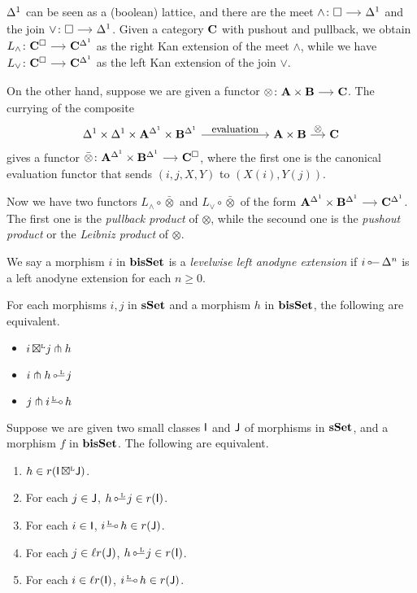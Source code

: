 \documentclass[a4paper,  dvipsnames, 11pt]{amsart}
\begin{document}
\begin{observation}
	${\Delta^1}$ can be seen as a (boolean) lattice, and there are
	the meet $\land\colon\Box\arr\ra$ and the join $\lor\colon\Box\arr\ra$.
	Given a category $\mathbf{C}$ with pushout and pullback,
	we obtain $L_\land\colon\one{C}^\Box\arr\one{C}^\ra$ as the right Kan extension of the meet $\land$,
	while we have $L_\lor\colon\one{C}^\Box\arr\one{C}^\ra$ as the left Kan extension of the join $\lor$.

	On the other hand, suppose we are given a functor $\otimes\colon\one{A}\times\one{B}\arr\one{C}$.
	The currying of the composite
	\[
		\ra\times\ra\times\one{A}^\ra\times\one{B}^\ra
		\arr"\text{evaluation}"[][6]
		\one{A}\times\one{B}
		\arr"\otimes"
		\one{C}
	\]
	gives a functor $\bar\otimes\colon\one{A}^\ra\times\one{B}^\ra\arr\one{C}^\Box$,
	where the first one is the canonical evaluation functor that sends $(i,j,X,Y)$ to $(X(i),Y(j))$.

	Now we have two functors $L_\land\circ\bar\otimes$ and $L_\lor\circ\bar\otimes$ of the form $\one{A}^\ra\times\one{B}^\ra\arr\one{C}^\ra$.
	The first one is the \textit{pullback product} of $\otimes$, while the secound one is the \textit{pushout product} or the \textit{Leibniz product} of $\otimes$.
\end{observation}
\begin{definition}
	We say a morphism $i$ in $\mathbf{bisSet}$
	is a \emph{levelwise left anodyne extension} if
	$i\lollipop \Delta^n$ is a left anodyne extension for each $n\geq 0$.
\end{definition}
\begin{lemma}
	\label{lem:pitchfork}
	For each morphisms $i,j$ in $\mathbf{sSet}$ and a morphism $h$ in $\mathbf{bisSet}$, the following are equivalent.
	\begin{itemize}
		\item %
			$i{\mathrel{\,\boxtimes^{\text{\tiny{L}}}}} j\pitchfork h$
		\item %
			$i\pitchfork h\lollipopL j$
		\item %
			$j\pitchfork i\rollipopL h$
	\end{itemize}
\end{lemma}
\begin{lemma}
	Suppose we are given two small classes $\mathsf{I}$ and $\mathsf{J}$ of morphisms in $\mathbf{sSet}$, and a morphism $f$ in $\mathbf{bisSet}$.
	The following are equivalent.
	\begin{enumerate}
		\item %
			$h\in r(\mathsf{I}{\mathrel{\,\boxtimes^{\text{\tiny{L}}}}}\mathsf{J})$.
		\item %
			For each $j\in\mathsf{J}$, $h\lollipopL j\in r(\I)$.
		\item %
			For each $i\in\mathsf{I}$, $i\rollipopL h\in r(\J)$.
		\item %
			For each $j\in\ell r(\mathsf{J})$, $h\lollipopL j\in r(\I)$.
		\item %
			For each $i\in\ell r(\mathsf{I})$, $i\rollipopL h\in r(\J)$.
	\end{enumerate}
\end{lemma}
\end{document}
